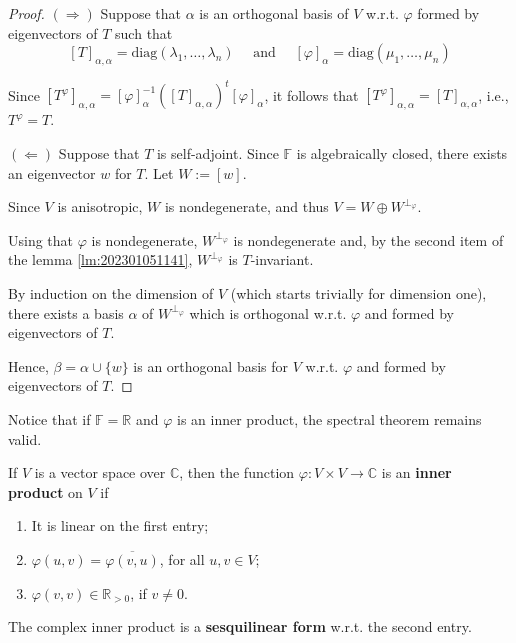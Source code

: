 \begin{proof}
  $(\Rightarrow)$ Suppose that $\alpha$ is an orthogonal basis of $V$ w.r.t. $\varphi$ formed by eigenvectors of $T$ such that 
  \[
    [T]_{\alpha, \alpha} = \text{diag}(\lambda_1, \ldots, \lambda_n) \quad \text{ and } \quad [\varphi]_\alpha = \text{diag}(\mu_1, \ldots, \mu_n)
  \]

  Since $[T^\varphi]_{\alpha, \alpha} = [\varphi]_\alpha^{-1} ([T]_{\alpha, \alpha})^t [\varphi]_\alpha$, it follows that $[T^\varphi]_{\alpha, \alpha} = [T]_{\alpha, \alpha}$, i.e., $T^\varphi = T$.

  $(\Leftarrow)$ Suppose that $T$ is self-adjoint. Since $\mathbb{F}$ is algebraically closed, there exists an eigenvector $w$ for $T$. Let $W := [w]$. 

  Since $V$ is anisotropic, $W$ is nondegenerate, and thus $V = W \oplus W^{\perp_\varphi}$. 

  Using that $\varphi$ is nondegenerate, $W^{\perp_\varphi}$ is nondegenerate and, by the second item of the lemma \ref{lm:202301051141}, $W^{\perp_\varphi}$ is $T$-invariant. 

  By induction on the dimension of $V$ (which starts trivially for dimension one), there exists a basis $\alpha$ of $W^{\perp_\varphi}$ which is orthogonal w.r.t. $\varphi$ and formed by eigenvectors of $T$. 

  Hence, $\beta = \alpha \cup \{ w \}$ is an orthogonal basis for $V$ w.r.t. $\varphi$ and formed by eigenvectors of $T$.
\end{proof}

Notice that if $\mathbb{F} = \mathbb{R}$ and $\varphi$ is an inner product, the spectral theorem remains valid. 

\begin{definition}
	If $V$ is a vector space over $\mathbb{C}$, then the function $\varphi : V \times V \longrightarrow \mathbb{C}$ is an \textbf{inner product} on $V$ if
	\begin{enumerate}
		\item It is linear on the first entry; 
		\item $\varphi(u,v) = \overline{\varphi(v,u)}$, for all $u, v \in V$; 
		\item $\varphi(v,v) \in \mathbb{R}_{> 0}$, if $v \neq 0$. 
	\end{enumerate}
\end{definition}

The complex inner product is a \textbf{sesquilinear form} w.r.t. the second entry. 

